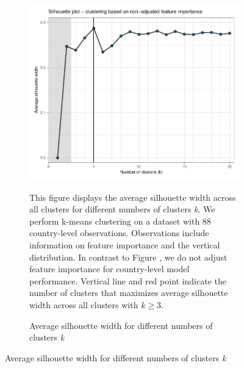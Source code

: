 \begin{figure}[ht!]\ContinuedFloat
   \centering
   \begin{subfigure}[b]{\textwidth}
   \centering
   \includegraphics{Figures_Appendix/Figure_Silhouette_1.pdf}
   \caption{Average silhouette width for different numbers of clusters \textit{k}} \label{fig:G1_silhouette}
   \begin{subcaption2}
     This figure displays the average silhouette width across all clusters for different numbers of clusters \textit{k}. We perform k-means clustering on a dataset with 88 country-level observations. Observations include information on feature importance and the vertical distribution. In contrast to Figure , we do not adjust feature importance for country-level model performance. Vertical line and red point indicate the number of clusters that maximizes average silhouette width across all clusters with $k \geq 3$.
   \end{subcaption2}
   \end{subfigure}
 \end{figure}

 \clearpage

